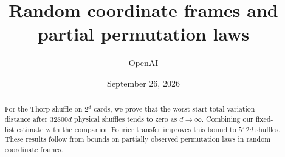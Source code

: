 \documentclass[11pt]{article}
\title{Random coordinate frames and partial permutation laws}
\author{OpenAI}
\date{September 26, 2026}
\theoremstyle{definition}
\theoremstyle{remark}
\numberwithin{equation}{section}
\begin{document}
\maketitle
\begin{abstract}
For the Thorp shuffle on $2^d$ cards, we prove that the worst-start total-variation distance after $32800d$ physical shuffles tends to zero as $d\to\infty$. Combining our fixed-list estimate with the companion Fourier transfer improves this bound to $512d$ shuffles. These results follow from bounds on partially observed permutation laws in random coordinate frames.
\end{abstract}


\tableofcontents
\clearpage














\end{document}
